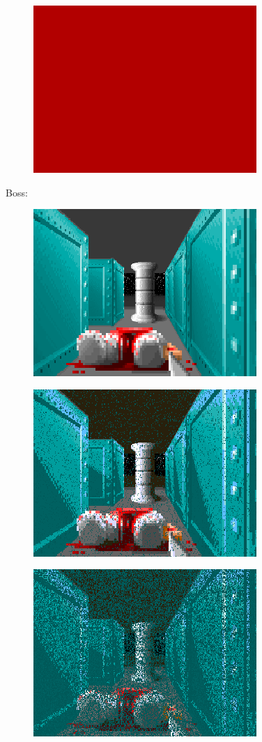         \begin{figure}[H] \centering \includegraphics[scale=1.0]{imgs/fizzlefade/dying/screenshot_86.png} \end{figure}

Boss:\\
\begin{figure}[H] \centering \includegraphics[scale=1.0]{imgs/fizzlefade/boss/screenshot_60.png} \end{figure}        
\begin{figure}[H] \centering \includegraphics[scale=1.0]{imgs/fizzlefade/boss/screenshot_66.png} \end{figure}        
\begin{figure}[H] \centering \includegraphics[scale=1.0]{imgs/fizzlefade/boss/screenshot_102.png} \end{figure}        
